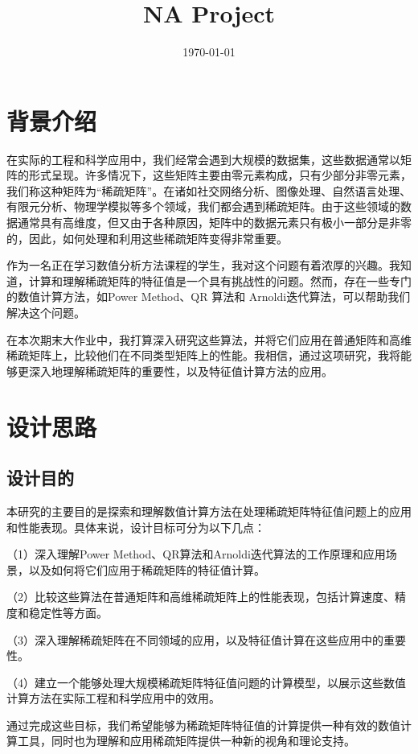 \documentclass{source/Report}
\title{NA Project}
\date{\today}
\begin{document}
    \makecover
    \makeheader
    \tableofcontents
    \newpage
    \section{背景介绍}
    在实际的工程和科学应用中，我们经常会遇到大规模的数据集，这些数据通常以矩阵的形式呈现。许多情况下，这些矩阵主要由零元素构成，只有少部分非零元素，我们称这种矩阵为“稀疏矩阵”。在诸如社交网络分析、图像处理、自然语言处理、有限元分析、物理学模拟等多个领域，我们都会遇到稀疏矩阵。由于这些领域的数据通常具有高维度，但又由于各种原因，矩阵中的数据元素只有极小一部分是非零的，因此，如何处理和利用这些稀疏矩阵变得非常重要。

    作为一名正在学习数值分析方法课程的学生，我对这个问题有着浓厚的兴趣。我知道，计算和理解稀疏矩阵的特征值是一个具有挑战性的问题。然而，存在一些专门的数值计算方法，如Power Method、QR 算法和 Arnoldi迭代算法，可以帮助我们解决这个问题。

    在本次期末大作业中，我打算深入研究这些算法，并将它们应用在普通矩阵和高维稀疏矩阵上，比较他们在不同类型矩阵上的性能。我相信，通过这项研究，我将能够更深入地理解稀疏矩阵的重要性，以及特征值计算方法的应用。
    \section{设计思路}
    \subsection{设计目的}
    本研究的主要目的是探索和理解数值计算方法在处理稀疏矩阵特征值问题上的应用和性能表现。具体来说，设计目标可分为以下几点：

    （1）深入理解Power Method、QR算法和Arnoldi迭代算法的工作原理和应用场景，以及如何将它们应用于稀疏矩阵的特征值计算。

    （2）比较这些算法在普通矩阵和高维稀疏矩阵上的性能表现，包括计算速度、精度和稳定性等方面。

    （3）深入理解稀疏矩阵在不同领域的应用，以及特征值计算在这些应用中的重要性。

    （4）建立一个能够处理大规模稀疏矩阵特征值问题的计算模型，以展示这些数值计算方法在实际工程和科学应用中的效用。

    通过完成这些目标，我们希望能够为稀疏矩阵特征值的计算提供一种有效的数值计算工具，同时也为理解和应用稀疏矩阵提供一种新的视角和理论支持。
\end{document}
